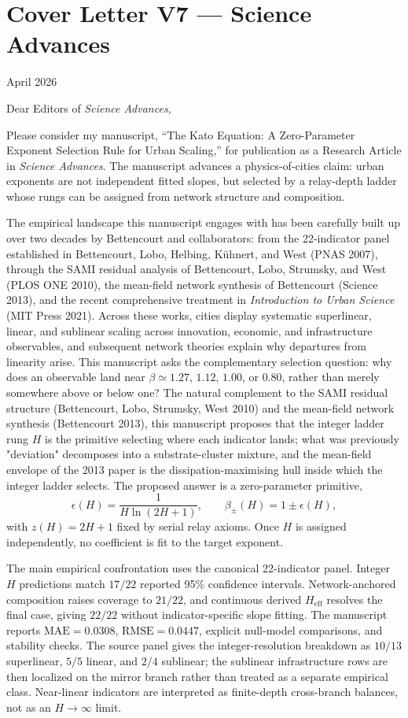 \documentclass[11pt]{article}
\begin{document}
\section*{Cover Letter V7 --- Science Advances}

April 2026

Dear Editors of \emph{Science Advances},

Please consider my manuscript, ``The Kato Equation: A Zero-Parameter Exponent Selection Rule for Urban Scaling,'' for publication as a Research Article in \emph{Science Advances}. The manuscript advances a physics-of-cities claim: urban exponents are not independent fitted slopes, but selected by a relay-depth ladder whose rungs can be assigned from network structure and composition.

The empirical landscape this manuscript engages with has been carefully built up over two decades by Bettencourt and collaborators: from the 22-indicator panel established in Bettencourt, Lobo, Helbing, K{\"u}hnert, and West (PNAS 2007), through the SAMI residual analysis of Bettencourt, Lobo, Strumsky, and West (PLOS ONE 2010), the mean-field network synthesis of Bettencourt (Science 2013), and the recent comprehensive treatment in \emph{Introduction to Urban Science} (MIT Press 2021). Across these works, cities display systematic superlinear, linear, and sublinear scaling across innovation, economic, and infrastructure observables, and subsequent network theories explain why departures from linearity arise. This manuscript asks the complementary selection question: why does an observable land near \(\beta\simeq 1.27\), \(1.12\), \(1.00\), or \(0.80\), rather than merely somewhere above or below one? The natural complement to the SAMI residual structure (Bettencourt, Lobo, Strumsky, West 2010) and the mean-field network synthesis (Bettencourt 2013), this manuscript proposes that the integer ladder rung $H$ is the primitive selecting where each indicator lands; what was previously "deviation" decomposes into a substrate-cluster mixture, and the mean-field envelope of the 2013 paper is the dissipation-maximising hull inside which the integer ladder selects. The proposed answer is a zero-parameter primitive,
\[
\epsilon(H)=\frac{1}{H\ln(2H+1)},\qquad
\beta_{\pm}(H)=1\pm\epsilon(H),
\]
with \(z(H)=2H+1\) fixed by serial relay axioms. Once \(H\) is assigned independently, no coefficient is fit to the target exponent.

The main empirical confrontation uses the canonical 22-indicator panel. Integer \(H\) predictions match \(17/22\) reported 95\% confidence intervals. Network-anchored composition raises coverage to \(21/22\), and continuous derived \(H_{\mathrm{eff}}\) resolves the final case, giving \(22/22\) without indicator-specific slope fitting. The manuscript reports \(\mathrm{MAE}=0.0308\), \(\mathrm{RMSE}=0.0447\), explicit null-model comparisons, and stability checks. The source panel gives the integer-resolution breakdown as \(10/13\) superlinear, \(5/5\) linear, and \(2/4\) sublinear; the sublinear infrastructure rows are then localized on the mirror branch rather than treated as a separate empirical class. Near-linear indicators are interpreted as finite-depth cross-branch balances, not as an \(H\to\infty\) limit.
\end{document}
